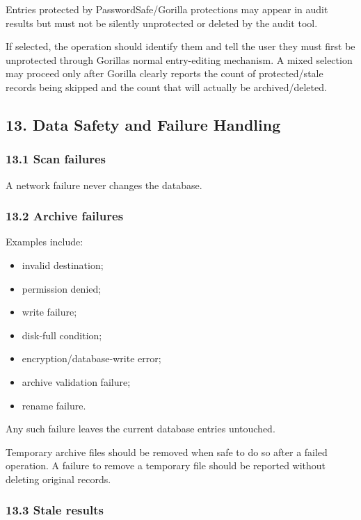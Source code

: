 \documentclass[
  letterpaper,
]{article}
\providecommand{\tightlist}{%
  \setlength{\itemsep}{0pt}\setlength{\parskip}{0pt}}
\begin{document}
Entries protected by PasswordSafe/Gorilla protections may appear in audit results but must not be silently unprotected
or deleted by the audit tool.

If selected, the operation should identify them and tell the user they must first be unprotected through
Gorilla\textquotesingle s normal entry-editing mechanism. A mixed selection may proceed only after Gorilla clearly
reports the count of protected/stale records being skipped and the count that will actually be archived/deleted.

\subsection{13. Data Safety and Failure Handling}\label{13-data-safety-and-failure-handling}

\subsubsection{13.1 Scan failures}\label{131-scan-failures}

A network failure never changes the database.

\subsubsection{13.2 Archive failures}\label{132-archive-failures}

Examples include:

\begin{itemize}
\tightlist
\item
  invalid destination;
\item
  permission denied;
\item
  write failure;
\item
  disk-full condition;
\item
  encryption/database-write error;
\item
  archive validation failure;
\item
  rename failure.
\end{itemize}

Any such failure leaves the current database entries untouched.

Temporary archive files should be removed when safe to do so after a failed operation. A failure to remove a temporary
file should be reported without deleting original records.

\subsubsection{13.3 Stale results}\label{133-stale-results}
\end{document}
